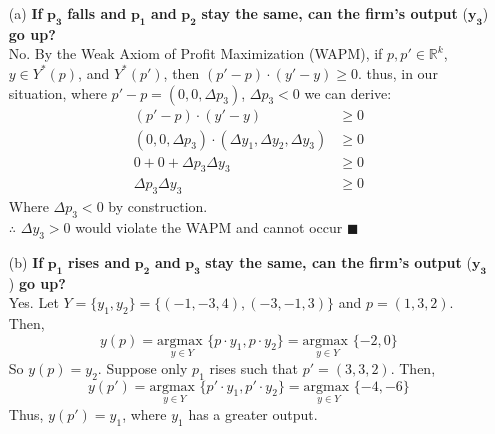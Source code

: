 \documentclass{article}
\newcommand{\R}{\mathbb{R}}
\begin{document}
\begin{itemize}
	\item[(a)] \textbf{If} $\mathbf{p_3}$ \textbf{falls and} $\mathbf{p_1}$ \textbf{and} $\mathbf{p_2}$ \textbf{stay the same, can the firm's output} ($\mathbf{y_3}$) \textbf{go up?}
		\smallskip \\
		No. By the Weak Axiom of Profit Maximization (WAPM), if $p,p'\in\R^k$, $y\in Y^*(p)$, and $Y^*(p')$, then $(p'-p)\cdot(y'-y)\geq0$. thus, in our situation, where $p'-p=(0,0,\Delta p_3)$, $\Delta p_3<0$ we can derive:
		\begin{align*}
			(p'-p)\cdot(y'-y) 										&\geq 0 \\														
			(0,0,\Delta p_3)\cdot(\Delta y_1,\Delta y_2,\Delta y_3)	&\geq 0 \\	
			0 + 0 + \Delta p_3 \Delta y_3 							&\geq 0 \\
			\Delta p_3 \Delta y_3 									&\geq 0 
		\end{align*}
		Where $\Delta p_3<0$ by construction. 
		\smallskip \\
		$\therefore$ $\Delta y_3 > 0$ would violate the WAPM and cannot occur $\blacksquare$
		
	\item[(b)] \textbf{If} $\mathbf{p_1}$ \textbf{rises and} $\mathbf{p_2}$ \textbf{and} $\mathbf{p_3}$ \textbf{stay the same, can the firm's output} ($\mathbf{y_3}$) \textbf{go up?}
		\smallskip \\
		Yes. Let $Y=\{y_1,y_2\}=\{(-1,-3,4),(-3,-1,3)\}$ and $p=(1,3,2)$. Then,
		\[
			y(p) = \underset{y\in Y}{\text{argmax }}\{p\cdot y_1,p\cdot y_2\} = \underset{y\in Y}{\text{argmax }}\{-2,0\} 
		\]
		So $y(p)=y_2$. Suppose only $p_1$ rises such that $p'=(3,3,2)$. Then,
		\[
			y(p') = \underset{y\in Y}{\text{argmax }}\{p'\cdot y_1,p'\cdot y_2\} = \underset{y\in Y}{\text{argmax }}\{-4,-6\} 
		\]
		Thus, $y(p')=y_1$, where $y_1$ has a greater output.
		

\end{itemize}
\end{document}
